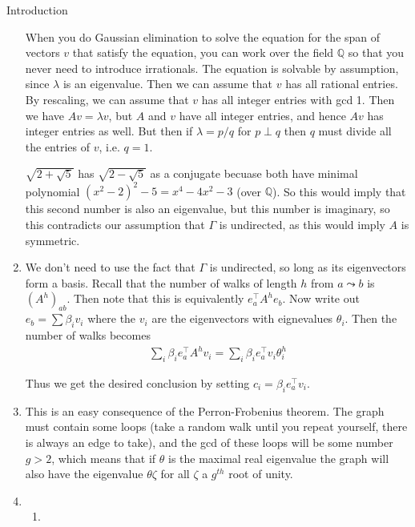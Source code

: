 \documentclass{article}
\newcommand{\Q}{\mathbb Q}
\begin{document}
\begin{section}{Introduction}
\begin{enumerate}
      When you do Gaussian elimination to solve the equation for the span of vectors $v$ that satisfy the equation, you can work over the field $\Q$ so that you never need to introduce irrationals.
      The equation is solvable by assumption, since $\lambda$ is an eigenvalue.
      Then we can assume that $v$ has all rational entries.
      By rescaling, we can assume that $v$ has all integer entries with gcd 1.
      Then we have $Av = \lambda v$, but $A$ and $v$ have all integer entries, and hence $Av$ has integer entries as well.
      But then if $\lambda = p/q$ for $p \perp q$ then $q$ must divide all the entries of $v$, i.e. $q = 1$.

      $\sqrt{2+\sqrt{5}}$ has $\sqrt{2-\sqrt{5}}$ as a conjugate becuase both have minimal polynomial $(x^2-2)^2 - 5 = x^4 - 4x^2 - 3$ (over $\Q$).
      So this would imply that this second number is also an eigenvalue, but this number is imaginary, so this contradicts our assumption that $\Gamma$ is undirected, as this would imply $A$ is symmetric.
    \item
      We don't need to use the fact that $\Gamma$ is undirected, so long as its eigenvectors form a basis.
      Recall that the number of walks of length $h$ from $a \leadsto b$ is $(A^h)_{ab}$.
      Then note that this is equivalently $e_a^\intercal A^h e_b$.
      Now write out $e_b = \sum \beta_i v_i$ where the $v_i$ are the eigenvectors with eignevalues $\theta_i$.
      Then the number of walks becomes
      \begin{equation}
	\begin{aligned}
	  \sum_i \beta_i e_a^\intercal A^h v_i =\sum_i \beta_i e_a^\intercal v_i \theta_i^h
	\end{aligned}
      \end{equation}

      Thus we get the desired conclusion by setting $c_i = \beta_i e_a^\intercal v_i$.

    \item
      This is an easy consequence of the Perron-Frobenius theorem.
      The graph must contain some loops (take a random walk until you repeat yourself, there is always an edge to take), and the gcd of these loops will be some number $g > 2$, which means that if $\theta$ is the maximal real eigenvalue the graph will also have the eigenvalue $\theta\zeta$ for all $\zeta$ a $g^{th}$ root of unity.

    \item
      \begin{enumerate}
	\item


\end{enumerate}
\end{enumerate}
\end{section}
\end{document}
